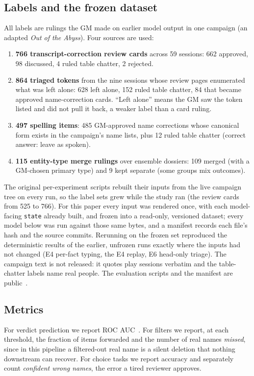 \documentclass[11pt]{article}
\begin{document}
\subsection{Labels and the frozen dataset}
All labels are rulings the GM made on earlier model output in one campaign (an adapted
\emph{Out of the Abyss}). Four sources are used:
\begin{enumerate}
  \item \textbf{766 transcript-correction review cards} across 59 sessions: 662 approved, 98
        discussed, 4 ruled table chatter, 2 rejected.
  \item \textbf{864 triaged tokens} from the nine sessions whose review pages enumerated what was
        left alone: 628 left alone, 152 ruled table chatter, 84 that became approved
        name-correction cards. ``Left alone'' means the GM saw the token listed and did not pull it
        back, a weaker label than a card ruling.
  \item \textbf{497 spelling items}: 485 GM-approved name corrections whose canonical form exists
        in the campaign's name lists, plus 12 ruled table chatter (correct answer: leave as spoken).
  \item \textbf{115 entity-type merge rulings} over ensemble dossiers: 109 merged (with a GM-chosen
        primary type) and 9 kept separate (some groups mix outcomes).
\end{enumerate}
The original per-experiment scripts rebuilt their inputs from the live campaign tree on every run,
so the label sets grew while the study ran (the review cards from 525 to 766). For this paper every
input was rendered once, with each model-facing \texttt{state} already built, and frozen into a
read-only, versioned dataset; every model below was run against those same bytes, and a manifest
records each file's hash and the source commits. Rerunning on the frozen set reproduced the
deterministic results of the earlier, unfrozen runs exactly where the inputs had not changed (E4
per-fact typing, the E4 replay, E6 head-only triage). The campaign text is not released: it quotes
play sessions verbatim and the table-chatter labels name real people. The evaluation scripts and
the manifest are public~\cite{dgxfun}.

\subsection{Metrics}
For verdict prediction we report ROC AUC~\cite{hanley1982}. For filters we report, at each threshold,
the fraction of items forwarded and the number of real names \emph{missed}, since in this pipeline a
filtered-out real name is a silent deletion that nothing downstream can recover. For choice tasks we
report accuracy and separately count \emph{confident wrong names}, the error a tired reviewer
approves.
\end{document}
